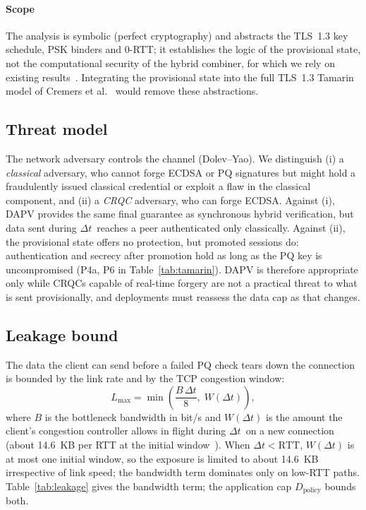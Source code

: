 \documentclass[preprint,10pt,3p]{elsarticle}
\newcommand{\Dt}{\ensuremath{\Delta t}}
\begin{document}
\paragraph{Scope} The analysis is symbolic (perfect cryptography) and
abstracts the TLS~1.3 key schedule, PSK binders and 0-RTT; it establishes
the logic of the provisional state, not the computational security of the
hybrid combiner, for which we rely on existing
results~\cite{Bindel2017,BindelHale2023}.  Integrating the provisional state
into the full TLS~1.3 Tamarin model of Cremers et al.~\cite{Cremers2017}
would remove these abstractions.

\subsection{Threat model}

The network adversary controls the channel (Dolev--Yao).  We distinguish
(i) a \emph{classical} adversary, who cannot forge ECDSA or PQ signatures
but might hold a fraudulently issued classical credential or exploit a flaw
in the classical component, and (ii) a \emph{CRQC} adversary, who can forge
ECDSA.  Against (i), DAPV provides the same final guarantee as synchronous
hybrid verification, but data sent during \Dt\ reaches a peer
authenticated only classically.  Against (ii), the provisional state offers
no protection, but promoted sessions do: authentication and secrecy after
promotion hold as long as the PQ key is uncompromised (P4a, P6 in
Table~\ref{tab:tamarin}).  DAPV is therefore appropriate only while CRQCs
capable of real-time forgery are not a practical threat to what is sent
provisionally, and deployments must reassess the data cap as that
changes.

\subsection{Leakage bound}
\label{sec:leakage}

The data the client can send before a failed PQ check tears down the
connection is bounded by the link rate and by the TCP congestion window:
\begin{equation}
  L_\text{max} = \min\!\left(\frac{B\,\Dt}{8},\; W(\Dt)\right),
  \label{eq:leakage}
\end{equation}
where $B$ is the bottleneck bandwidth in bit/s and $W(\Dt)$ is the amount
the client's congestion controller allows in flight during \Dt\ on a new
connection (about 14.6~KB per RTT at the initial window~\cite{RFC6928}).
When $\Dt < \mathrm{RTT}$, $W(\Dt)$ is at most one initial window, so the
exposure is limited to about 14.6~KB irrespective of link speed; the
bandwidth term dominates only on low-RTT paths.  Table~\ref{tab:leakage}
gives the bandwidth term; the application cap $D_\text{policy}$ bounds both.
\end{document}
